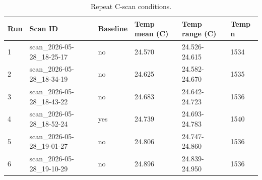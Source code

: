 \begin{table}[htbp]
\centering
\caption{Repeat C-scan conditions.}
\label{tab:cscan_noise_conditions}
\begin{tabular}{llllll}
\hline
Run & Scan ID & Baseline & Temp mean (C) & Temp range (C) & Temp n \\
\hline
1 & scan_2026-05-28_18-25-17 & no & 24.570 & 24.526-24.615 & 1534 \\
2 & scan_2026-05-28_18-34-19 & no & 24.625 & 24.582-24.670 & 1535 \\
3 & scan_2026-05-28_18-43-22 & no & 24.683 & 24.642-24.723 & 1536 \\
4 & scan_2026-05-28_18-52-24 & yes & 24.739 & 24.693-24.783 & 1540 \\
5 & scan_2026-05-28_19-01-27 & no & 24.806 & 24.747-24.860 & 1536 \\
6 & scan_2026-05-28_19-10-29 & no & 24.896 & 24.839-24.950 & 1536 \\
\hline
\end{tabular}
\end{table}
